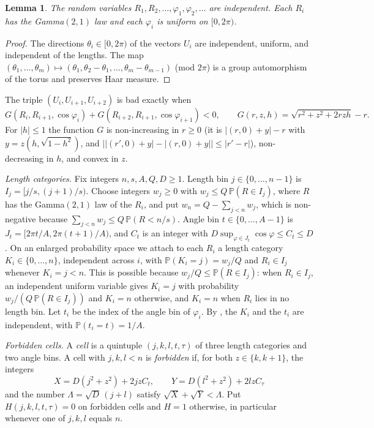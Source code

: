 \documentclass[11pt]{article}
\newtheorem{lemma}[theorem]{Lemma}
\theoremstyle{remark}
\newcommand{\Prob}{\mathbb{P}}
\begin{document}
\begin{lemma}\label{lem:angles}
The random variables $R_1,R_2,\dots,\varphi_1,\varphi_2,\dots$ are independent. Each $R_i$ has the Gamma$(2,1)$
law and each $\varphi_i$ is uniform on $[0,2\pi)$.
\end{lemma}

\begin{proof}
The directions $\theta_i\in[0,2\pi)$ of the vectors $U_i$ are independent, uniform, and independent of the lengths. The map
$(\theta_1,\dots,\theta_m)\mapsto(\theta_1,\theta_2-\theta_1,\dots,\theta_m-\theta_{m-1})$ (mod $2\pi$) is a group
automorphism of the torus and preserves Haar measure.
\end{proof}

The triple $(U_i,U_{i+1},U_{i+2})$ is bad exactly when
\begin{equation}\label{eq:bad}
G(R_i,R_{i+1},\cos\varphi_i)+G(R_{i+2},R_{i+1},\cos\varphi_{i+1})<0,\qquad G(r,z,h)=\sqrt{r^2+z^2+2rzh}-r .
\end{equation}
For $|h|\le 1$ the function $G$ is non-increasing in $r\ge 0$ (it is $|(r,0)+y|-r$ with $y=z(h,\sqrt{1-h^2})$, and
$\bigl||(r',0)+y|-|(r,0)+y|\bigr|\le|r'-r|$), non-decreasing in $h$, and convex in $z$.

\emph{Length categories.} Fix integers $n,s,A,Q,D\ge 1$. Length bin $j\in\{0,\dots,n-1\}$ is $I_j=[j/s,(j+1)/s)$.
Choose integers $w_j\ge 0$ with $w_j\le Q\,\Prob(R\in I_j)$, where $R$ has the Gamma$(2,1)$ law of the $R_i$, and put $w_n=Q-\sum_{j<n}w_j$, which is non-negative because $\sum_{j<n}w_j\le Q\,\Prob(R<n/s)$. Angle bin
$t\in\{0,\dots,A-1\}$ is $J_t=[2\pi t/A,2\pi(t+1)/A)$, and $C_t$ is an integer with $D\sup_{\varphi\in J_t}
\cos\varphi\le C_t\le D$. On an enlarged probability space we attach to each $R_i$ a length category $K_i\in\{0,\dots,n\}$, independent
across $i$, with $\Prob(K_i=j)=w_j/Q$ and $R_i\in I_j$ whenever $K_i=j<n$. This is possible because
$w_j/Q\le\Prob(R\in I_j)$: when $R_i\in I_j$, an independent uniform variable gives $K_i=j$ with probability
$w_j/(Q\,\Prob(R\in I_j))$ and $K_i=n$ otherwise, and $K_i=n$ when $R_i$ lies in no length bin. Let $t_i$ be the
index of the angle bin of $\varphi_i$. By , the $K_i$ and the $t_i$ are
independent, with $\Prob(t_i=t)=1/A$.

\emph{Forbidden cells.} A \emph{cell} is a quintuple $(j,k,l,t,\tau)$ of three length categories and two angle bins. A
cell with $j,k,l<n$ is \emph{forbidden} if, for both $z\in\{k,k+1\}$, the integers
\[
X=D(j^2+z^2)+2jzC_t,\qquad Y=D(l^2+z^2)+2lzC_\tau
\]
and the number $\Lambda=\sqrt D\,(j+l)$ satisfy $\sqrt X+\sqrt Y<\Lambda$. Put $H(j,k,l,t,\tau)=0$ on forbidden cells and $H=1$ otherwise, in particular
whenever one of $j,k,l$ equals $n$.
\end{document}
